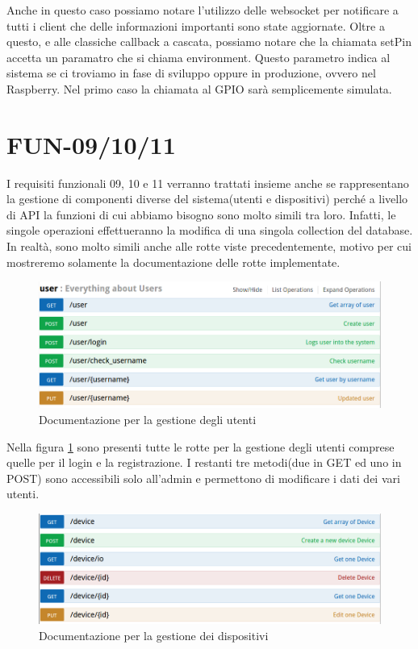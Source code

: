 Anche in questo caso possiamo notare l'utilizzo delle websocket per notificare a tutti i client che delle informazioni importanti sono state aggiornate.
Oltre a questo, e alle classiche callback a cascata, possiamo notare che la chiamata setPin accetta un paramatro che si chiama environment.
Questo parametro indica al sistema se ci troviamo in fase di sviluppo oppure in produzione, ovvero nel Raspberry.
Nel primo caso la chiamata al GPIO sarà semplicemente simulata.

\section{FUN-09/10/11}
I requisiti funzionali 09, 10 e 11 verranno trattati insieme anche se rappresentano la gestione di componenti diverse del sistema(utenti e dispositivi) perché a livello di API la funzioni di cui abbiamo bisogno sono molto simili tra loro. 
Infatti, le singole operazioni effettueranno la modifica di una singola collection del database.
In realtà, sono molto simili anche alle rotte viste precedentemente, motivo per cui mostreremo solamente la documentazione delle rotte implementate.

\begin{figure}[h]
\centering
\includegraphics[width=1\textwidth]{API/user.png} 
\caption{Documentazione per la gestione degli utenti}
\label{fig:user}
\end{figure}

Nella figura \ref{fig:user} sono presenti tutte le rotte per la gestione degli utenti comprese quelle per il login e la registrazione.
I restanti tre metodi(due in GET ed uno in POST) sono accessibili solo all'admin e permettono di modificare i dati dei vari utenti.

\begin{figure}[h]
\centering
\includegraphics[width=1\textwidth]{API/device.png} 
\caption{Documentazione per la gestione dei dispositivi}
\label{fig:device}
\end{figure}

